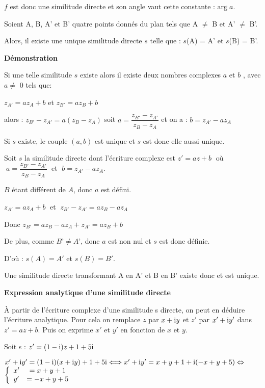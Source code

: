 \medskip

$f$ est donc  une similitude directe et son angle vaut cette constante : $ \text{arg}\; a $.

\begin{theorem}
 Soient A, B, A' et B' quatre points donnés du plan tels que A $ \neq $ B et A' $ \neq $ B'.
 
Alors, il existe une unique similitude directe $ s $ telle que : $ s $(A) = A' et $ s $(B) = B'.
\end{theorem}
 

 

\textbf{Démonstration}

\medskip

Si une telle similitude $ s $ existe alors il existe  deux nombres complexes $ a $ et $ b $ , avec  $ a\neq $ 0 tels que:

$z_{A'} = az_A + b$ \;  et \; $z_{B'} = az_B + b$


alors : $z_{B'} - z_{A'} = a (z_B - z_A)$  soit  $a=\dfrac{z_{B'}-z_{A'}}{z_B-z_A}   $ et on a : $   b = z_{A'} - az_A$

Si $ s $ existe, le couple $( a , b )$ est unique et $ s $ est donc elle aussi unique.

Soit $s$  la similitude directe dont l'écriture complexe est $ z'=a z +b\; $ où  $ \; a=\dfrac{z_{B'}-z_{A'}}{z_B-z_A}\; $ et  $ \; b = z_{A'}-az_A $.

\medskip

$B$ étant différent de $A$, donc $a$ est défini.

$z_{A'} = az_A + b\;$   et  $\; z_{B'} - z_{A'} = az_B - az_A$

Donc $z_{B'} = az_B - az_A+ z_{A'} = az_B + b$

De plus, comme  $B’ \neq A’$, donc  $ a $ est non nul et $ s $ est donc définie.

D’où : $s(A) = A'$ et $s(B) = B'$.

\medskip
Une similitude directe transformant A en A' et B en B' existe donc et est unique.
\medskip

\textbf{ Expression analytique d'une similitude directe}

\medskip

À partir de l'écriture complexe d'une similitude s directe, on peut en déduire l'écriture analytique.  Pour cela on remplace $ z $ par $ x+\text{i} y $ et $ z' $ par $ x'+\text{i} y' $ dans $ z'=a z+b $. Puis on exprime $ x' $ et $ y' $ en fonction de $ x $ et $ y $.

\begin{example}
Soit s : $ z'=(1-\text{i} )z+1+5\text{i} $

$ x'+\text{i} y'=(1-\text{i} )(x+\text{i} y)+ 1+5\text{i} \Longleftrightarrow x'+\text{i} y'=x+ y +1 + \text{i}(-x+y +5) \Leftrightarrow $ $\left\{\begin{array}{l c l}
x'&=x+y+1      \\ 	 
 y'&=-x+y+5
\end{array}\right. $ 
\end{example}


